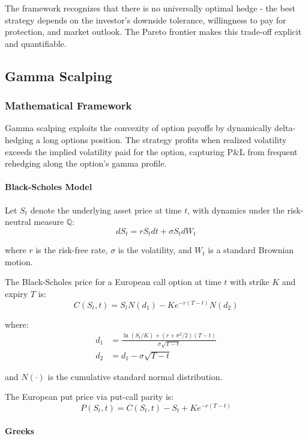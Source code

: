 The framework recognizes that there is no universally optimal hedge - the best strategy depends on the investor's downside tolerance, willingness to pay for protection, and market outlook. The Pareto frontier makes this trade-off explicit and quantifiable.

\subsection{Gamma Scalping}

\subsubsection{Mathematical Framework}

Gamma scalping exploits the convexity of option payoffs by dynamically delta-hedging a long options position. The strategy profits when realized volatility exceeds the implied volatility paid for the option, capturing P\&L from frequent rehedging along the option's gamma profile.

\paragraph{Black-Scholes Model}

Let $S_t$ denote the underlying asset price at time $t$, with dynamics under the risk-neutral measure $\mathbb{Q}$:
\[
dS_t = rS_t dt + \sigma S_t dW_t
\]

where $r$ is the risk-free rate, $\sigma$ is the volatility, and $W_t$ is a standard Brownian motion.

The Black-Scholes price for a European call option at time $t$ with strike $K$ and expiry $T$ is:
\[
C(S_t, t) = S_t N(d_1) - K e^{-r(T-t)} N(d_2)
\]

where:
\begin{align*}
d_1 &= \frac{\ln(S_t / K) + (r + \sigma^2/2)(T - t)}{\sigma \sqrt{T - t}} \\
d_2 &= d_1 - \sigma \sqrt{T - t}
\end{align*}

and $N(\cdot)$ is the cumulative standard normal distribution.

The European put price via put-call parity is:
\[
P(S_t, t) = C(S_t, t) - S_t + K e^{-r(T-t)}
\]

\paragraph{Greeks}

